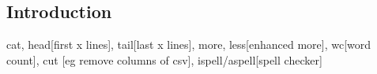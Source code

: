
\subsection{Introduction}
 
cat, head[first x lines], tail[last x lines], more, less[enhanced more], wc[word count], cut [eg remove columns of csv], ispell/aspell[spell checker]